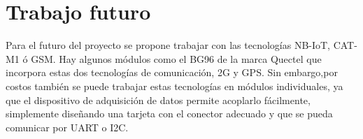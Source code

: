 \section{Trabajo futuro}

Para el futuro del proyecto se propone trabajar con las tecnologías NB-IoT, CAT-M1 ó GSM. Hay algunos módulos como el BG96 de la marca Quectel que incorpora estas dos tecnologías de comunicación, 2G y GPS. Sin embargo,por costos también se puede trabajar estas tecnologías en módulos individuales, ya que el dispositivo de adquisición de datos permite acoplarlo fácilmente, simplemente diseñando una tarjeta con el conector adecuado y que se pueda comunicar por UART o I2C. 





